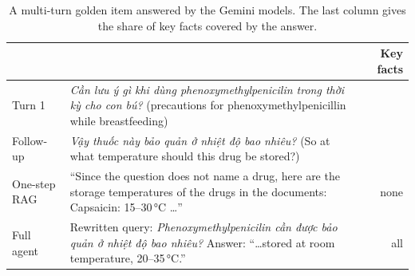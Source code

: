 \begin{table}[tb]
\centering
\caption{A multi-turn golden item answered by the Gemini models. The last column gives the share of key facts covered by the answer.}
\label{tab:example}
\footnotesize
\begin{tabularx}{\textwidth}{@{}l>{\raggedright\arraybackslash}Xr@{}}
\toprule
 & & Key facts \\
\midrule
Turn 1 & \textit{Cần lưu ý gì khi dùng phenoxymethylpenicilin trong thời kỳ cho con bú?} (precautions for phenoxymethylpenicillin while breastfeeding) & \\
Follow-up & \textit{Vậy thuốc này bảo quản ở nhiệt độ bao nhiêu?} (So at what temperature should this drug be stored?) & \\
\midrule
One-step RAG & ``Since the question does not name a drug, here are the storage temperatures of the drugs in the documents: Capsaicin: \mbox{15--30\,°C} \ldots'' & none \\
Full agent & Rewritten query: \textit{Phenoxymethylpenicilin cần được bảo quản ở nhiệt độ bao nhiêu?} Answer: ``\ldots stored at room temperature, \mbox{20--35\,°C}.'' & all \\
\bottomrule
\end{tabularx}
\end{table}
